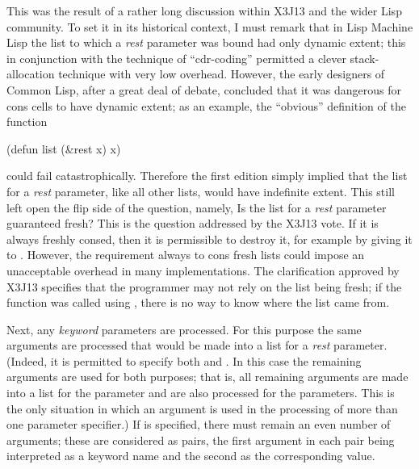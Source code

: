 This was the result of a rather long discussion within X3J13 and the
wider Lisp community.  To set it in its historical context, I must remark
that in Lisp Machine Lisp the list to which a \emph{rest} parameter was
bound had only dynamic extent; this in conjunction with the
technique of ``cdr-coding'' permitted a clever stack-allocation technique
with very low overhead.  However, the early designers of
Common Lisp, after a great deal of debate, concluded that it was dangerous
for cons cells to have dynamic extent; as an example, the ``obvious''
definition of the function 
\begin{lisp}
(defun list (\&rest x) x)
\end{lisp}
could fail catastrophically.  Therefore the first edition simply implied
that the list for a \emph{rest} parameter, like all other lists, would
have indefinite extent.  This still left open the flip side of the
question, namely, Is the list for a \emph{rest} parameter guaranteed fresh?
This is the question addressed by the X3J13 vote.
If it is always freshly consed, then it is permissible to destroy it,
for example by giving it to .  However, the requirement always
to cons fresh lists could impose an unacceptable overhead in many implementations.
The clarification approved by X3J13 specifies that the programmer may
not rely on the list being fresh; if the function was called using ,
there is no way to know where the list came from.

Next, any \emph{keyword} parameters are processed.
For this purpose the same arguments are processed that
would be made into a list for a \emph{rest} parameter.
(Indeed, it is permitted to specify both  and .
In this case the remaining arguments are used for both purposes;
that is, all remaining arguments are made into a list for the
 parameter and are also processed for the  parameters.
This is the only situation in which an argument is used
in the processing of more than one parameter specifier.)
If  is specified, there must remain
an even number of arguments; these are considered as pairs,
the first argument in each pair being interpreted as a keyword name
and the second as the corresponding value.

